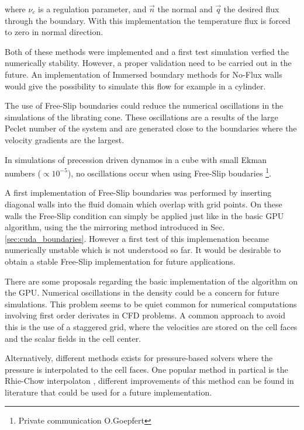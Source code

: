 where $\nu_c$ is a regulation parameter, and $\vec{n}$ the normal and $\vec{q}$  the desired flux through the boundary.
With this implementation the temperature flux is forced to zero in normal direction.

Both of these methods were implemented and a first test simulation verfied the numerically stability.
However, a proper validation need to be carried out in the future.
An implementation of Immersed boundary methods for No-Flux walls would give the possibility
to simulate this flow for example in a cylinder.

The use of Free-Slip boundaries could reduce the numerical oscillations in the simulations of the librating cone.
These oscillations are a results of the large Peclet number of the system and are generated
close to the boundaries where the velocity gradients are the largest.

In simulations of precession driven dynamos in a cube with small Ekman numbers ($\propto 10^{-5}$),
no oscillations occur when using Free-Slip boudaries \footnote{Private communication O.Goepfert}.

A first implementation of Free-Slip boundaries was performed
by inserting diagonal walls into the fluid domain which overlap with grid points.
On these walls the Free-Slip condition can simply be applied just like in the basic GPU algorithm,
using the the mirroring method introduced in Sec. \ref{sec:cuda_boundaries}.
However a first test of this implemenation became numerically unstable which is not understood so far.
It would be desirable to obtain a stable Free-Slip implementation for future applications.

There are some proposals regarding the basic implementation of the algorithm on the GPU.
Numerical oscillations in the density could be a concern for future simulations.
This problem seems to be quiet common for numerical computations involving first order derivates in CFD problems.
A common approach to avoid this is the use of a staggered grid, where the velocities
are stored on the cell faces and the scalar fields in the cell center.

Alternatively, different methods exists for pressure-based solvers where the pressure is interpolated to the cell faces.
One popular method in partical is the Rhie-Chow interpolaton \citep{uiae},
different improvements of this method can be found in literature \citep{uiae} that could be used for a future implementation.

